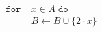 \documentclass[preview]{standalone}
\begin{document}
\begin{align*}
\mathtt{for} \; &x \in A \; \mathtt{do} \\&B \leftarrow B \cup \{2 \cdot x\}
\end{align*}
\end{document}
